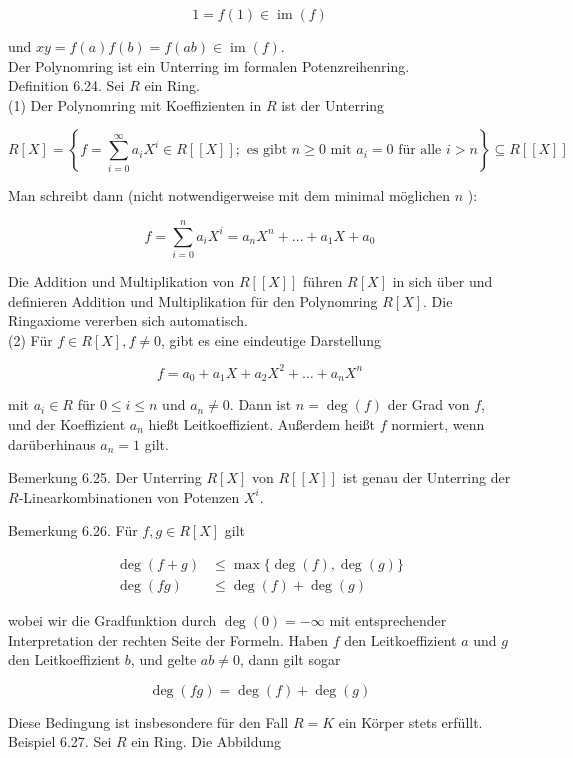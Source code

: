 \documentclass[10pt, letterpaper]{article}
\begin{document}
$$
1=f(1) \in \operatorname{im}(f)
$$

und $x y=f(a) f(b)=f(a b) \in \operatorname{im}(f)$.\\
Der Polynomring ist ein Unterring im formalen Potenzreihenring.\\
Definition 6.24. Sei $R$ ein Ring.\\
(1) Der Polynomring mit Koeffizienten in $R$ ist der Unterring

$$
R[X]=\left\{f=\sum_{i=0}^{\infty} a_{i} X^{i} \in R[[X]] ; \text { es gibt } n \geq 0 \text { mit } a_{i}=0 \text { für alle } i>n\right\} \subseteq R[[X]]
$$

Man schreibt dann (nicht notwendigerweise mit dem minimal möglichen $n$ ):

$$
f=\sum_{i=0}^{n} a_{i} X^{i}=a_{n} X^{n}+\ldots+a_{1} X+a_{0}
$$

Die Addition und Multiplikation von $R[[X]]$ führen $R[X]$ in sich über und definieren Addition und Multiplikation für den Polynomring $R[X]$. Die Ringaxiome vererben sich automatisch.\\
(2) Für $f \in R[X], f \neq 0$, gibt es eine eindeutige Darstellung

$$
f=a_{0}+a_{1} X+a_{2} X^{2}+\ldots+a_{n} X^{n}
$$

mit $a_{i} \in R$ für $0 \leq i \leq n$ und $a_{n} \neq 0$. Dann ist $n=\operatorname{deg}(f)$ der Grad von $f$, und der Koeffizient $a_{n}$ hießt Leitkoeffizient. Außerdem heißt $f$ normiert, wenn darüberhinaus $a_{n}=1$ gilt.

Bemerkung 6.25. Der Unterring $R[X]$ von $R[[X]]$ ist genau der Unterring der $R$-Linearkombinationen von Potenzen $X^{i}$.

Bemerkung 6.26. Für $f, g \in R[X]$ gilt

$$
\begin{aligned}
\operatorname{deg}(f+g) & \leq \max \{\operatorname{deg}(f), \operatorname{deg}(g)\} \\
\operatorname{deg}(f g) & \leq \operatorname{deg}(f)+\operatorname{deg}(g)
\end{aligned}
$$

wobei wir die Gradfunktion durch $\operatorname{deg}(0)=-\infty$ mit entsprechender Interpretation der rechten Seite der Formeln. Haben $f$ den Leitkoeffizient $a$ und $g$ den Leitkoeffizient $b$, und gelte $a b \neq 0$, dann gilt sogar

$$
\operatorname{deg}(f g)=\operatorname{deg}(f)+\operatorname{deg}(g)
$$

Diese Bedingung ist insbesondere für den Fall $R=K$ ein Körper stets erfüllt.\\
Beispiel 6.27. Sei $R$ ein Ring. Die Abbildung
\end{document}
